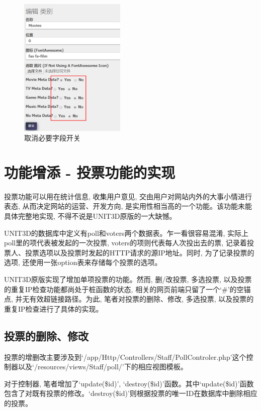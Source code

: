 \begin{figure}[ht]
    \centering
    \includegraphics[width=0.45\textwidth]{support-files/4.4-remove-requirement-for-tag-system.png}
    \caption{取消必要字段开关}
    \label{fig:disableforcemeta}
\end{figure}

\section{功能增添 - 投票功能的实现}

投票功能可以用在统计信息, 收集用户意见, 交由用户对网站内外的大事小情进行表态, 从而决定网站的运营、开发方向, 是实用性相当高的一个功能。该功能未能具体完整地实现, 不得不说是UNIT3D原版的一大缺憾。

UNIT3D的数据库中定义有poll和voters两个数据表。乍一看很容易混淆, 实际上poll里的项代表被发起的一次投票, voters的项则代表每人次投出去的票, 记录着投票人、投票选项以及投票时发起的HTTP请求的源IP地址。同时, 为了记录投票的选项, 还使用一张option表来存储每个投票的选项。

UNIT3D原版实现了增加单项投票的功能。然而, 删/改投票, 多选投票, 以及投票的重复IP检查功能都尚处于桩函数的状态, 相关的网页前端只留了一个`\#'的空锚点, 并无有效超链接路径。为此, 笔者对投票的删除、修改, 多选投票, 以及投票的重复IP检查进行了具体的实现。

\subsection{投票的删除、修改}

投票的增删改主要涉及到`/app/Http/Controllers/Staff/PollControler.php'这个控制器以及`/resources/views/Staff/poll/'下的相应视图模板。

对于控制器, 笔者增加了`update(\$id)', `destroy(\$id)'函数。其中`update(\$id)'函数包含了对既有投票的修改。`destroy(\$id)'则根据投票的唯一ID在数据库中删除相应的投票。

